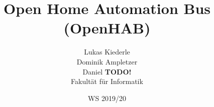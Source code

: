 \documentclass[twoside=true, %
    DIV=15
    ,%
    BCOR=15mm, %
    headinclude=true,
    footinclude=false,
    pagesize,%
    fontsize=11pt,%
    paper=a4,%
    numbers=noenddot
  ]{scrartcl}
\begin{document}
\def\figdir{figures}
\def\tabledir{tables}

\titlehead{
\raggedleft
\texttt{[image: \\figdir/logo-th-rosenheim-2019\_master\_quer\_2c.eps]}
}

\title{
\vspace*{0cm}
Open Home Automation Bus (OpenHAB)
}

\author{
Lukas Kiederle\\
Dominik Ampletzer\\
Daniel \textbf{TODO!}\\
Fakultät für Informatik}

\date{WS 2019/20}

\maketitle

\cleardoubleemptypage

\cleardoubleemptypage

\tableofcontents










\appendix





\end{document}
